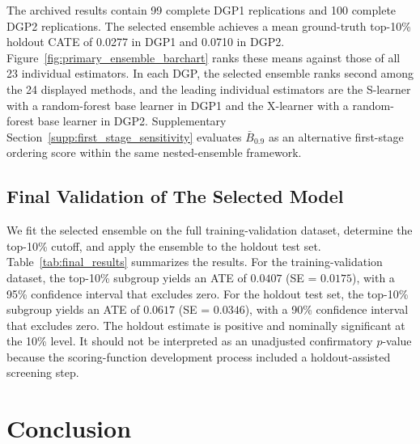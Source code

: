 \documentclass[12pt]{article}
\newcommand{\TargetFrac}{10{\%}\xspace}
\newcommand{\MainTVATE}{0.0407}
\newcommand{\MainTVSE}{0.0175}
\newcommand{\MainHOATE}{0.0617}
\newcommand{\MainHOSE}{0.0346}
\begin{document}
The archived results contain 99 complete DGP1 replications and 100 complete DGP2 replications. The selected ensemble achieves a mean ground-truth top-\TargetFrac holdout CATE of 0.0277 in DGP1 and 0.0710 in DGP2. Figure~\ref{fig:primary_ensemble_barchart} ranks these means against those of all 23 individual estimators. In each DGP, the selected ensemble ranks second among the 24 displayed methods, and the leading individual estimators are the S-learner with a random-forest base learner in DGP1 and the X-learner with a random-forest base learner in DGP2. Supplementary Section~\ref{supp:first_stage_sensitivity} evaluates $\bar B_{0.9}$ as an alternative first-stage ordering score within the same nested-ensemble framework.



\subsection{Final Validation of The Selected Model}
\label{sec:final_validation}

We fit the selected ensemble on the full training-validation dataset, determine the top-\TargetFrac cutoff, and apply the ensemble to the holdout test set. Table~\ref{tab:final_results} summarizes the results. For the training-validation dataset, the top-\TargetFrac subgroup yields an ATE of $\MainTVATE$ (SE = $\MainTVSE$), with a 95{\%} confidence interval that excludes zero. For the holdout test set, the top-\TargetFrac subgroup yields an ATE of $\MainHOATE$ (SE = $\MainHOSE$), with a 90{\%} confidence interval that excludes zero. The holdout estimate is positive and nominally significant at the 10{\%} level. It should not be interpreted as an unadjusted confirmatory $p$-value because the scoring-function development process included a holdout-assisted screening step.

\begingroup{}

\endgroup

\section{Conclusion}
\label{sec:conclusion}
\end{document}
